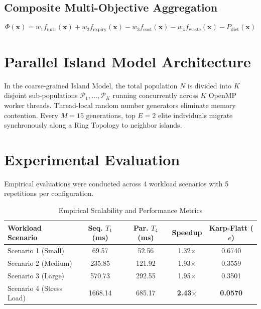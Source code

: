 ﻿\documentclass[conference]{IEEEtran}
\begin{document}
\subsection{Composite Multi-Objective Aggregation}
\begin{equation}
\Phi(\mathbf{x}) = w_1 f_{\text{nutr}}(\mathbf{x}) + w_2 f_{\text{expiry}}(\mathbf{x}) - w_3 f_{\text{cost}}(\mathbf{x}) - w_4 f_{\text{waste}}(\mathbf{x}) - P_{\text{diet}}(\mathbf{x})
\end{equation}

\section{Parallel Island Model Architecture}
In the coarse-grained Island Model, the total population $N$ is divided into $K$ disjoint sub-populations $\mathcal{P}_1, \dots, \mathcal{P}_K$ running concurrently across $K$ OpenMP worker threads. Thread-local random number generators eliminate memory contention. Every $M=15$ generations, top $E=2$ elite individuals migrate synchronously along a Ring Topology to neighbor islands.

\section{Experimental Evaluation}
Empirical evaluations were conducted across 4 workload scenarios with 5 repetitions per configuration.

\begin{table}[htbp]
\caption{Empirical Scalability and Performance Metrics}
\begin{center}
\begin{tabular}{lcccc}
\toprule
\textbf{Workload Scenario} & \textbf{Seq. $T_1$ (ms)} & \textbf{Par. $T_4$ (ms)} & \textbf{Speedup} & \textbf{Karp-Flatt ($e$)} \\
\midrule
Scenario 1 (Small) & 69.57 & 52.56 & 1.32$\times$ & 0.6740 \\
Scenario 2 (Medium) & 235.85 & 121.92 & 1.93$\times$ & 0.3559 \\
Scenario 3 (Large) & 570.73 & 292.55 & 1.95$\times$ & 0.3501 \\
Scenario 4 (Stress Load) & 1668.14 & 685.17 & \textbf{2.43$\times$} & \textbf{0.0570} \\
\bottomrule
\end{tabular}
\label{tab:perf}
\end{center}
\end{table}
\end{document}
